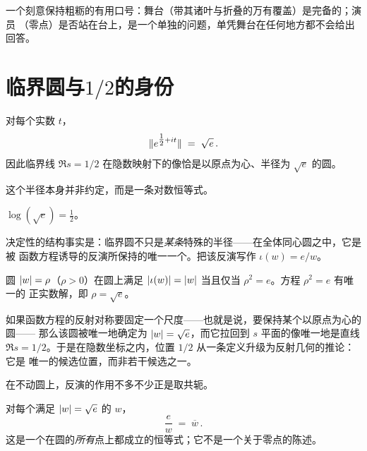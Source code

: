 \begin{remark}
一个刻意保持粗粝的有用口号：舞台（带其诸叶与折叠的万有覆盖）是完备的；演员
（零点）是否站在台上，是一个单独的问题，单凭舞台在任何地方都不会给出回答。
\end{remark}

\section{临界圆与\texorpdfstring{$1/2$}{1/2}的身份}
\label{sec:criticalcircle}

\begin{theorem}
\label{thm:critcircle}
对每个实数 $t$，
\[
  \lVert e^{\tfrac12+it}\rVert \;=\; \sqrt{e}\, .
\]
因此临界线 $\Re s=1/2$ 在隐数映射下的像恰是以原点为心、半径为 $\sqrt{e}$ 的圆。
\end{theorem}

这个半径本身并非约定，而是一条对数恒等式。

\begin{proposition}\label{prop:logsqrt}
$\log(\sqrt{e}) = \tfrac12$。
\end{proposition}

决定性的结构事实是：临界圆不只是\emph{某条}特殊的半径——在全体同心圆之中，它是被
函数方程诱导的反演所保持的唯一一个。把该反演写作 $\iota(w)=e/w$。

\begin{theorem}
\label{thm:fixedcircle}
圆 $\lvert w\rvert=\rho$（$\rho>0$）在圆上满足
$\lvert \iota(w)\rvert=\lvert w\rvert$ 当且仅当 $\rho^{2}=e$。方程 $\rho^{2}=e$ 有唯一的
正实数解，即 $\rho=\sqrt{e}$。
\end{theorem}

\begin{corollary}\label{cor:onesecond}
如果函数方程的反射对称要固定一个尺度——也就是说，要保持某个以原点为心的圆——
那么该圆被唯一地确定为 $\lvert w\rvert=\sqrt{e}$，而它拉回到 $s$ 平面的像唯一地是直线
$\Re s=1/2$。于是在隐数坐标之内，位置 $1/2$ 从一条定义升级为反射几何的推论：它是
唯一的候选位置，而非若干候选之一。
\end{corollary}

在不动圆上，反演的作用不多不少正是取共轭。

\begin{theorem}\label{thm:invconj}
对每个满足 $\lvert w\rvert=\sqrt{e}$ 的 $w$，
\[
  \frac{e}{w} \;=\; \overline{w}\, .
\]
这是一个在圆的\emph{所有}点上都成立的恒等式；它不是一个关于零点的陈述。
\end{theorem}

